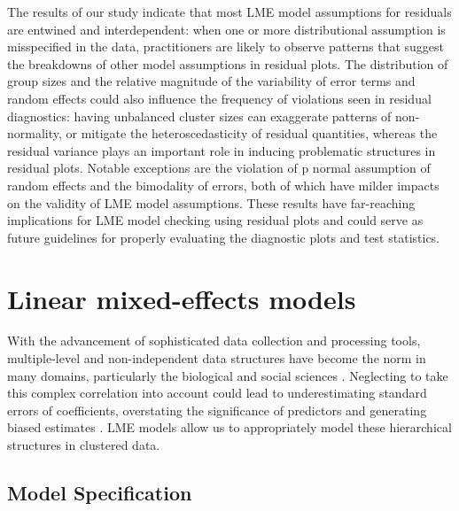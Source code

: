 \documentclass[12pt]{article}
\begin{document}
The results of our study indicate that most LME model assumptions for
residuals are entwined and interdependent: when one or more
distributional assumption is misspecified in the data, practitioners are
likely to observe patterns that suggest the breakdowns of other model
assumptions in residual plots. The distribution of group sizes and the
relative magnitude of the variability of error terms and random effects
could also influence the frequency of violations seen in residual
diagnostics: having unbalanced cluster sizes can exaggerate patterns of
non-normality, or mitigate the heteroscedasticity of residual
quantities, whereas the residual variance plays an important role in
inducing problematic structures in residual plots. Notable exceptions
are the violation of p normal assumption of random effects and the
bimodality of errors, both of which have milder impacts on the validity
of LME model assumptions. These results have far-reaching implications
for LME model checking using residual plots and could serve as future
guidelines for properly evaluating the diagnostic plots and test
statistics.

\section{Linear mixed-effects models}

With the advancement of sophisticated data collection and processing
tools, multiple-level and non-independent data structures have become
the norm in many domains, particularly the biological and social
sciences \citep{bolker2008ecological, raudenbush2002hierarchical}.
Neglecting to take this complex correlation into account could lead to
underestimating standard errors of coefficients, overstating the
significance of predictors and generating biased estimates
\citep{gurka2011avoiding, Roback2021}. LME models allow us to
appropriately model these hierarchical structures in clustered data.

\subsection{Model Specification}
\end{document}
